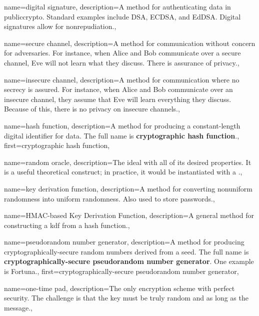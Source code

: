 {
    name={digital signature},
    description={A method for authenticating data in \gls{publiccrypto}.
        Standard examples include DSA, ECDSA, and EdDSA.
        Digital signatures allow for nonrepudiation.},
}

{
    name={secure channel},
    description={A method for communication without concern for adversaries.
        For instance, when Alice and Bob communicate over a secure channel,
        Eve will not learn what they discuss.
        There is assurance of privacy.},
}

{
    name={insecure channel},
    description={A method for communication where no secrecy is assured.
        For instance, when Alice and Bob communicate over an insecure channel,
        they assume that Eve will learn everything they discuss.
        Because of this, there is no privacy on insecure channels.},
}

{
    name={hash function},
    description={A method for producing a constant-length digital identifier
        for data.
        The full name is \textbf{cryptographic hash function}.},
    first={cryptographic hash function},
}

{
    name={random oracle},
    description={The ideal 
        with all of its desired properties.
        It is a useful theoretical construct;
        in practice, it would be instantiated with a
        .},
}

{
    name={key derivation function},
    description={A method for converting nonuniform randomness into
        uniform randomness.
        Also used to store passwords.},
}

{
    name={HMAC-based Key Derivation Function},
    description={A general method for constructing
        a \gls{kdf} from a \gls{hash function}.},
}

{
    name={pseudorandom number generator},
    description={A method for producing cryptographically-secure
        random numbers derived from a seed.
        The full name is
        \textbf{cryptographically-secure pseudorandom number generator}.
        One example is Fortuna.},
    first={cryptographically-secure pseudorandom number generator},
}

{
    name={one-time pad},
    description={The only \gls{encryption scheme} with \gls{perfect security}.
        The challenge is that the key must be truly random
        and as long as the message.},
}


